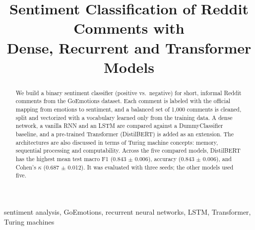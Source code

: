 \documentclass[conference]{IEEEtran}
\begin{document}
\title{Sentiment Classification of Reddit Comments with\\Dense, Recurrent and Transformer Models}

\author{
}

\maketitle

\begin{abstract}
We build a binary sentiment classifier (positive vs.\ negative) for short, informal Reddit
comments from the GoEmotions dataset. Each comment is labeled with the official mapping from
emotions to sentiment, and a balanced set of 1,000 comments is cleaned, split and vectorized
with a vocabulary learned only from the training data. A dense network, a vanilla RNN and an
LSTM are compared against a DummyClassifier baseline, and a pre-trained Transformer
(DistilBERT) is added as an extension. The architectures are also discussed in terms of
Turing machine concepts: memory, sequential processing and computability.
Across the five compared models, DistilBERT has the highest mean test macro
F1 (0.843 $\pm$ 0.006), accuracy (0.843 $\pm$ 0.006), and Cohen's
$\kappa$ (0.687 $\pm$ 0.012). It was evaluated with three seeds; the other
models used five.
\end{abstract}

\begin{IEEEkeywords}
sentiment analysis, GoEmotions, recurrent neural networks, LSTM, Transformer, Turing machines
\end{IEEEkeywords}











\end{document}
